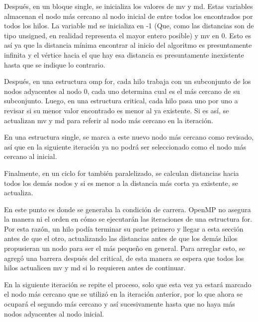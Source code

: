 \documentclass[11pt]{article}
\begin{document}
\par
Después, en un bloque single, se inicializa los valores de mv y md. Estas variables almacenan el nodo más cercano al nodo inicial de entre todos los encontrados por todos los hilos. La variable md se inicializa en -1 (Que, como las distancias son de tipo unsigned, en realidad representa el mayor entero posible) y mv en 0. Esto es así ya que la distancia mínima encontrar al inicio del algoritmo es presuntamente infinita y el vértice hacia el que hay esa distancia es presuntamente inexistente hasta que se indique lo contrario.
\par
Después, en una estructura omp for, cada hilo trabaja con un subconjunto de los nodos adyacentes al nodo 0, cada uno determina cual es el más cercano de su subconjunto. Luego, en una estructura critical, cada hilo pasa uno por uno a revisar si su menor valor encontrado es menor al ya existente. Si es así, se actualizan mv y md para referir al nodo más cercano en la iteración.
\par
En una estructura single, se marca a este nuevo nodo más cercano como revisado, así que en la siguiente iteración ya no podrá ser seleccionado como el nodo más cercano al inicial.
\par
Finalmente, en un ciclo for también paralelizado, se calculan distancias hacia todos los demás nodos y si es menor a la distancia más corta ya existente, se actualiza. 
\par
En este punto es donde se generaba la condición de carrera. OpenMP no asegura la manera ni el orden en cómo se ejecutarán las iteraciones de una estructura for. Por esta razón, un hilo podía terminar su parte primero y llegar a esta sección antes de que el otro, actualizando las distancias antes de que los demás hilos propusieran un nodo para ser el más pequeño en general. Para arreglar esto, se agregó una barrera después del critical, de esta manera se espera que todos los hilos actualicen mv y md si lo requieren antes de continuar. 
\par
En la siguiente iteración se repite el proceso, solo que esta vez ya estará marcado el nodo más cercano que se utilizó en la iteración anterior, por lo que ahora se ocupará el segundo más cercano y así sucesivamente hasta que no haya más nodos adyacentes al nodo inicial.
\end{document}
